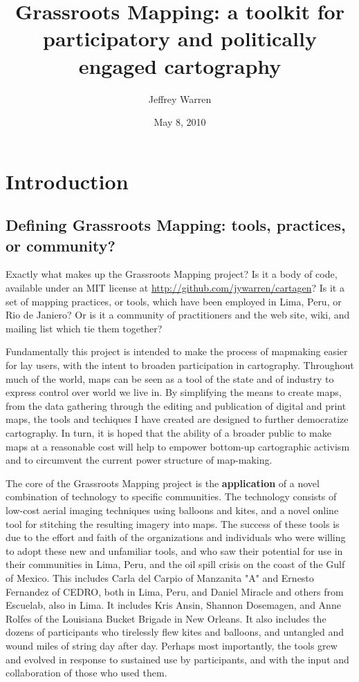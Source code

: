 \documentclass[11pt]{report}
\title{Grassroots Mapping: a toolkit for participatory and politically engaged cartography}
\author{Jeffrey Warren}
\date{May 8, 2010}
\begin{document}
\maketitle

\chapter{Introduction}

\section{Defining Grassroots Mapping: tools, practices, or community?}

Exactly what makes up the Grassroots Mapping project? Is it a body of code, available under an MIT license at \url{http://github.com/jywarren/cartagen}? Is it a set of mapping practices, or tools, which have been employed in Lima, Peru, or Rio de Janiero? Or is it a community of practitioners and the web site, wiki, and mailing list which tie them together?

Fundamentally this project is intended to make the process of mapmaking easier for lay users, with the intent to broaden participation in cartography. Throughout much of the world, maps can be seen as a tool of the state and of industry to express control over world we live in. By simplifying the means to create maps, from the data gathering through the editing and publication of digital and print maps, the tools and techiques I have created are designed to further democratize cartography. In turn, it is hoped that the ability of a broader public to make maps at a reasonable cost will help to empower bottom-up cartographic activism and to circumvent the current power structure of map-making. 

The core of the Grassroots Mapping project is the \textbf{application} of a novel combination of technology to specific communities. The technology consists of low-cost aerial imaging techniques using balloons and kites, and a novel online tool for stitching the resulting imagery into maps. The success of these tools is due to the effort and faith of the organizations and individuals who were willing to adopt these new and unfamiliar tools, and who saw their potential for use in their communities in Lima, Peru, and the oil spill crisis on the coast of the Gulf of Mexico. This includes Carla del Carpio of Manzanita "A" and Ernesto Fernandez of CEDRO, both in Lima, Peru, and Daniel Miracle and others from Escuelab, also in Lima. It includes Kris Ansin, Shannon Dosemagen, and Anne Rolfes of the Louisiana Bucket Brigade in New Orleans. It also includes the dozens of participants who tirelessly flew kites and balloons, and untangled and wound miles of string day after day. Perhaps most importantly, the tools grew and evolved in response to sustained use by participants, and with the input and collaboration of those who used them.
\end{document}

